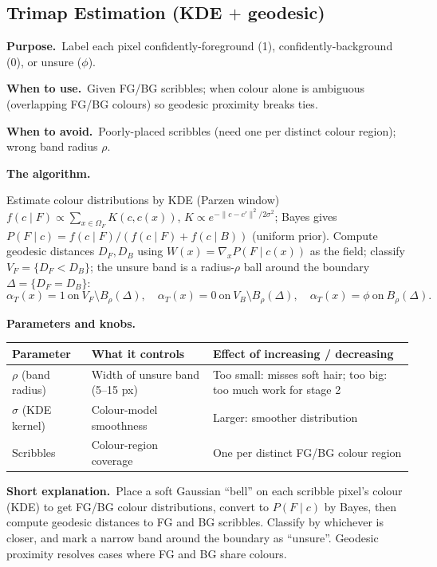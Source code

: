 \documentclass[10pt]{article}
\makeatletter
\newcommand{\Purpose}{\par\smallskip\textbf{Purpose.}\ }
\newcommand{\WhenUse}{\par\textbf{When to use.}\ }
\newcommand{\WhenAvoid}{\par\textbf{When to avoid.}\ }
\newcommand{\TheAlgo}{\par\smallskip\textbf{The algorithm.}\par\nopagebreak}
\newcommand{\Knobs}{\par\smallskip\textbf{Parameters and knobs.}\par\nopagebreak}
\newcommand{\ShortExp}{\par\smallskip\textbf{Short explanation.}\ }
\newenvironment{ptable}{\begin{center}\small\begin{tabular}{@{}p{2.5cm} p{5.9cm} p{6.2cm}@{}}\toprule
Parameter & What it controls & Effect of increasing / decreasing \\ \midrule}
{\bottomrule\end{tabular}\end{center}}
\makeatother
\begin{document}
\subsection{Trimap Estimation (KDE $+$ geodesic)}
\Purpose Label each pixel confidently-foreground (1), confidently-background (0), or unsure ($\phi$).
\WhenUse Given FG/BG scribbles; when colour alone is ambiguous (overlapping FG/BG colours) so geodesic
proximity breaks ties.
\WhenAvoid Poorly-placed scribbles (need one per distinct colour region); wrong band radius $\rho$.
\TheAlgo Estimate colour distributions by KDE (Parzen window)
$f(c\mid F)\propto\sum_{x\in\Omega_F}K(c,c(x))$, $K\propto e^{-\|c-c'\|^2/2\sigma^2}$; Bayes gives
$P(F\mid c)=f(c\mid F)/(f(c\mid F)+f(c\mid B))$ (uniform prior). Compute geodesic distances $D_F,D_B$ using
$W(x)=\nabla_x P(F\mid c(x))$ as the field; classify $V_F=\{D_F<D_B\}$; the unsure band is a radius-$\rho$
ball around the boundary $\Delta=\{D_F=D_B\}$:
\[
\alpha_T(x)=1\ \text{on}\ V_F\setminus B_\rho(\Delta),\quad
\alpha_T(x)=0\ \text{on}\ V_B\setminus B_\rho(\Delta),\quad
\alpha_T(x)=\phi\ \text{on}\ B_\rho(\Delta).
\]
\Knobs
\begin{ptable}
$\rho$ (band radius) & Width of unsure band (5--15 px) & Too small: misses soft hair; too big: too much work for stage 2 \\
$\sigma$ (KDE kernel) & Colour-model smoothness & Larger: smoother distribution \\
Scribbles & Colour-region coverage & One per distinct FG/BG colour region \\
\end{ptable}
\ShortExp Place a soft Gaussian ``bell'' on each scribble pixel's colour (KDE) to get FG/BG colour
distributions, convert to $P(F\mid c)$ by Bayes, then compute geodesic distances to FG and BG scribbles.
Classify by whichever is closer, and mark a narrow band around the boundary as ``unsure''. Geodesic
proximity resolves cases where FG and BG share colours.

\end{document}

